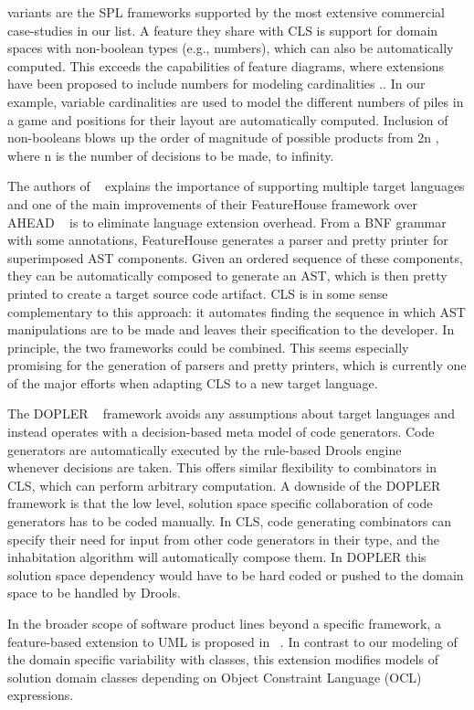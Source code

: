 variants are the SPL frameworks supported by the most extensive commercial case-studies in our list. A feature they
share with CLS is support for domain spaces with non-boolean types (e.g., numbers), which can also be automatically
computed. This exceeds the capabilities of feature diagrams, where extensions have been proposed to include numbers for
modeling cardinalities .\cite{Sousa:2016:EFM:2934466.2934475}. In our example, variable cardinalities are used to model
the different numbers of piles in a game and positions for their layout are automatically computed. Inclusion of non-booleans blows up
 the order of magnitude of possible products from 2n , where n is the number of decisions to be made, to infinity.

The authors of ~\cite{Apel:2009:FLA:1555001.1555038} explains the importance of supporting multiple target languages and one of the main improvements of
their FeatureHouse framework over AHEAD ~\cite{Batory2004FeatureorientedPA} is to eliminate language extension overhead. From a BNF grammar with some
annotations, FeatureHouse generates a parser and pretty printer for superimposed AST components. Given an ordered
sequence of these components, they can be automatically composed to generate an AST, which is then pretty printed
to create a target source code artifact. CLS is in some sense complementary to this approach: it automates finding the
sequence in which AST manipulations are to be made and leaves their specification to the developer. In principle, the
two frameworks could be combined. This seems especially promising for the generation of parsers and pretty printers,
which is currently one of the major efforts when adapting CLS to a new target language.

The DOPLER ~\cite{Dhungana:2011:DMD:1924082.1924092} framework avoids any assumptions about target languages and instead
 operates with a decision-based meta model of code generators. Code generators are automatically executed by the
 rule-based Drools engine ~\cite{DBLP:conf/agtive/2007} whenever decisions are taken. This offers similar flexibility to combinators in CLS,
 which can perform arbitrary computation. A downside of the DOPLER framework is that the low level, solution space
 specific collaboration of code generators has to be coded manually. In CLS, code generating combinators can specify
 their need for input from other code generators in their type, and the inhabitation algorithm will automatically
 compose them. In DOPLER this solution space dependency would have to be hard coded or pushed to the domain space
 to be handled by Drools.


In the broader scope of software product lines beyond a specific framework, a feature-based extension to UML
is proposed in ~\cite{Czarnecki:2006:VFM:1173706.1173738}. In contrast to our modeling of the domain specific
variability with classes, this extension modifies models of solution domain classes depending on Object Constraint
Language (OCL) expressions.

